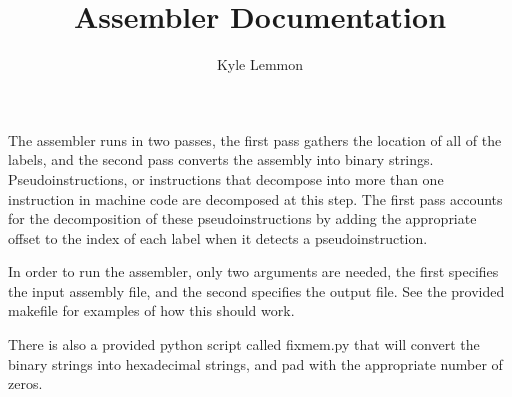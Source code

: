 \documentclass[../ProjectDocumentation.tex]{subfiles}
\title{\textbf{Assembler Documentation}}
\author{Kyle Lemmon}
\date{}
\begin{document}
\maketitle

The assembler runs in two passes, the first pass gathers the location of all of the labels, and the second pass converts the assembly into binary strings. Pseudoinstructions, or instructions that decompose into more than one instruction in machine code are decomposed at this step. The first pass accounts for the decomposition of these pseudoinstructions by adding the appropriate offset to the index of each label when it detects a pseudoinstruction.

In order to run the assembler, only two arguments are needed, the first specifies the input assembly file, and the second specifies the output file. See the provided makefile for examples of how this should work.

There is also a provided python script called fixmem.py that will convert the binary strings into hexadecimal strings, and pad with the appropriate number of zeros.
\end{document}
